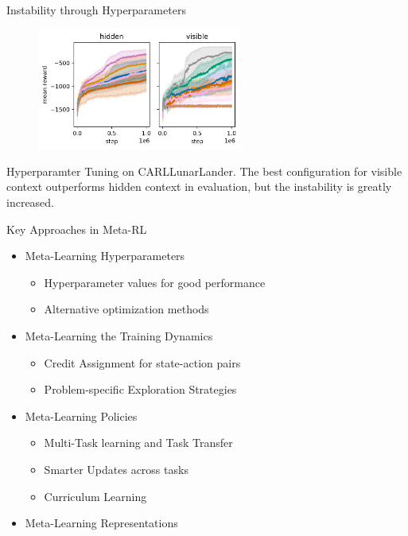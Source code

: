 \documentclass[aspectratio=169]{../latex_main/tntbeamer}  %
\begin{document}
\begin{frame}[c]{Instability through Hyperparameters~}

\begin{figure}
    \centering
    \includegraphics[width=0.6\textwidth]{w09_meta_rl/images/pb2workers_CARLPendulumEnv_hidden_vs_visible.png}
    \label{fig:my_label}
\end{figure}
\centering Hyperparamter Tuning on CARLLunarLander. The best configuration for visible context outperforms hidden context in evaluation, but the instability is greatly increased.

\end{frame}

\begin{frame}[c]{Key Approaches in Meta-RL}
	
	\begin{itemize}
		\item Meta-Learning Hyperparameters
		\begin{itemize}
			\item Hyperparameter values for good performance
			\item Alternative optimization methods
		\end{itemize}
		\item Meta-Learning the Training Dynamics
		\begin{itemize}
			\item Credit Assignment for state-action pairs
			\item Problem-specific Exploration Strategies
		\end{itemize}
		\item Meta-Learning Policies
		\begin{itemize}
		    \item Multi-Task learning and Task Transfer
			\item Smarter Updates across tasks
			\item Curriculum Learning
		\end{itemize}
		\item Meta-Learning Representations
	\end{itemize}
	
	
\end{frame}
\end{document}
